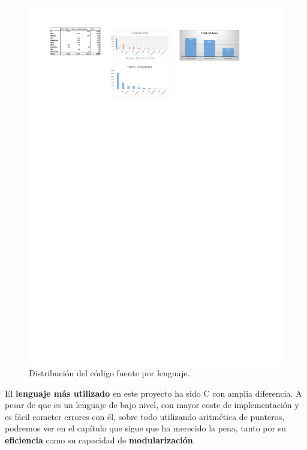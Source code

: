 \smallskip

\begin{figure}[H]
	\noindent \begin{centering}
		\includegraphics[width=\linewidth*3/4]{capitulo5/lineas_lenguajes}
		\par\end{centering}
	\smallskip
	\caption{\label{fig:lineas_lenguajes} Distribución del código fuente por lenguaje.}
\end{figure} 

\smallskip

El \textbf{lenguaje más utilizado} en este proyecto ha sido C con amplia diferencia. A pesar de que es un lenguaje de bajo nivel, con mayor coste de implementación y es fácil cometer errores con él, sobre todo utilizando aritmética de punteros, podremos ver en el capítulo que sigue que ha merecido la pena, tanto por su \textbf{eficiencia} como su capacidad de \textbf{modularización}.

\newpage
\clearpage{\pagestyle{empty}\cleardoublepage}
